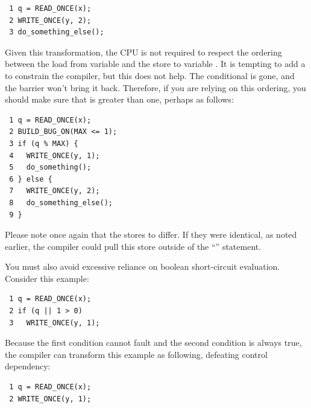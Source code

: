 \begin{enumerate}
\vspace{5pt}
\begin{minipage}[t]{\columnwidth}
\scriptsize
\begin{verbatim}
 1 q = READ_ONCE(x);
 2 WRITE_ONCE(y, 2);
 3 do_something_else();
\end{verbatim}
\end{minipage}
\vspace{5pt}

Given this transformation, the CPU is not required to respect the ordering
between the load from variable  and the store to variable .
It is tempting to add a  to constrain the compiler,
but this does not help.
The conditional is gone, and the barrier won't bring it back.
Therefore, if you are relying on this ordering, you should make sure
that  is greater than one, perhaps as follows:

\vspace{5pt}
\begin{minipage}[t]{\columnwidth}
\scriptsize
\begin{verbatim}
 1 q = READ_ONCE(x);
 2 BUILD_BUG_ON(MAX <= 1);
 3 if (q % MAX) {
 4   WRITE_ONCE(y, 1);
 5   do_something();
 6 } else {
 7   WRITE_ONCE(y, 2);
 8   do_something_else();
 9 }
\end{verbatim}
\end{minipage}
\vspace{5pt}

Please note once again that the stores to  differ.
If they were identical, as noted earlier, the compiler could pull this
store outside of the ``'' statement.

You must also avoid excessive reliance on boolean short-circuit evaluation.
Consider this example:

\vspace{5pt}
\begin{minipage}[t]{\columnwidth}
\scriptsize
\begin{verbatim}
 1 q = READ_ONCE(x);
 2 if (q || 1 > 0)
 3   WRITE_ONCE(y, 1);
\end{verbatim}
\end{minipage}
\vspace{5pt}

Because the first condition cannot fault and the second condition is
always true, the compiler can transform this example as following,
defeating control dependency:

\vspace{5pt}
\begin{minipage}[t]{\columnwidth}
\scriptsize
\begin{verbatim}
 1 q = READ_ONCE(x);
 2 WRITE_ONCE(y, 1);
\end{verbatim}
\end{minipage}
\vspace{5pt}


\end{enumerate}
